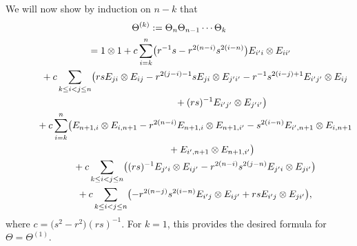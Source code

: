 \documentclass[10pt,a4paper]{amsart}
\numberwithin{equation}{section}
\begin{document}
We will now show by induction on $n - k$ that{\samepage
\begin{gather}
 \Theta^{(k)} := \Theta_{n}\Theta_{n-1}\cdots \Theta_{k}\nonumber\\
 \hphantom{\Theta^{(k)}{:}}{} =
 1 \otimes 1 + c\sum_{i = k}^{n}\bigl(r^{-1}s - r^{2(n - i)}s^{2(i-n)}\bigr)E_{i'i} \otimes E_{ii'} \nonumber\\
 \hphantom{\Theta^{(k)} :=}{}
 + c \sum_{k \le i < j \le n}\bigl(rsE_{ji} \otimes E_{ij} - r^{2(j - i)-1}sE_{ji} \otimes E_{j'i'} - r^{-1}s^{2(i - j) + 1}E_{i'j'} \otimes E_{ij}\nonumber\\
 \hphantom{\Theta^{(k)} :=+ c \sum_{k \le i < j \le n}\bigl(}{}
 + (rs)^{-1}E_{i'j'} \otimes E_{j'i'}\bigr)\nonumber \\
 \hphantom{\Theta^{(k)} :=}{}
 + c\sum_{i = k}^{n}\bigl(E_{n + 1,i} \otimes E_{i,n+1} - r^{2(n - i)}E_{n + 1,i} \otimes E_{n + 1,i'} - s^{2(i-n)}E_{i',n+1} \otimes E_{i,n+1}\nonumber\\
 \hphantom{\Theta^{(k)} :=+ c\sum_{i = k}^{n}\bigl(}{}
 + E_{i',n+1} \otimes E_{n + 1,i'} \bigr) \nonumber\\
 \hphantom{\Theta^{(k)} :=}{}
 + c \sum_{k \le i < j \le n}\bigl( (rs)^{-1}E_{j'i} \otimes E_{ij'} - r^{2(n-i)}s^{2(j - n)}E_{j'i} \otimes E_{ji'}\bigr) \nonumber\\
 \hphantom{\Theta^{(k)} :=}{}
 +c\sum_{k \le i < j \le n}\bigl( - r^{2(n - j)}s^{2(i - n)}E_{i'j} \otimes E_{ij'} + rsE_{i'j} \otimes E_{ji'} \bigr),\label{eq:Theta_k}
\end{gather}
where $c = \bigl(s^{2} - r^{2}\bigr)(rs)^{-1}$. For $k=1$, this provides the desired formula for $\Theta=\Theta^{(1)}$.}
\end{document}
